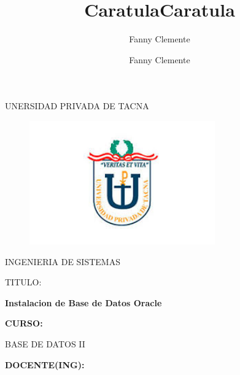 \documentclass[12pt,letterpaper]{article}
\author{Fanny Clemente}
\title{Caratula}
\begin{document}
\author{Fanny Clemente}
\title{Caratula}

\begin{titlepage}
\begin{center}
\large{UNERSIDAD PRIVADA DE TACNA}\\
\vspace*{-0.025in}
\begin{figure}[htb]
\begin{center}
\includegraphics[width=8cm]{./IMG/logo}
\end{center}
\end{figure}
\vspace*{0.15in}
INGENIERIA DE SISTEMAS  \\

\vspace*{0.5in}
\begin{large}
TITULO:\\
\end{large}

\vspace*{0.1in}
\begin{Large}
\textbf{Instalacion de Base de Datos Oracle} \\
\end{Large}

\vspace*{0.3in}
\begin{Large}
\textbf{CURSO:} \\
\end{Large}

\vspace*{0.1in}
\begin{large}
BASE DE DATOS II\\
\end{large}

\vspace*{0.3in}
\begin{Large}
\textbf{DOCENTE(ING):} \\
\end{Large}


\end{center}
\end{titlepage}
\end{document}
